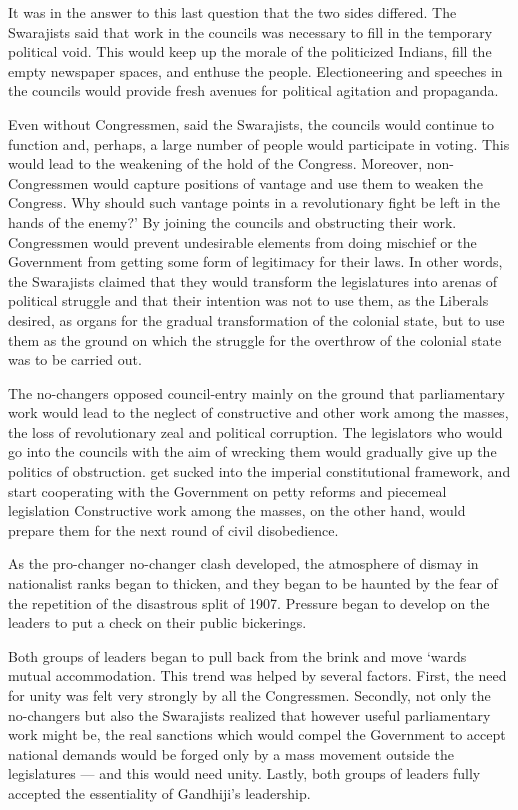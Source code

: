 It was in the answer to this last question that the two sides differed. The Swarajists said that work in the councils was necessary to fill in the temporary political void. This would keep up the morale of the politicized Indians, fill the empty newspaper spaces, and enthuse the people. Electioneering and speeches in the councils would provide fresh avenues for political agitation and propaganda.

Even without Congressmen, said the Swarajists, the councils would continue to function and, perhaps, a large number of people would participate in voting. This would lead to the weakening of the hold of the Congress. Moreover, non- Congressmen would capture positions of vantage and use them to weaken the Congress. Why should such vantage points in a revolutionary fight be left in the hands of the enemy?' By joining the councils and obstructing their work. Congressmen would prevent undesirable elements from doing mischief or the Government from getting some form of legitimacy for their laws. In other words, the Swarajists claimed that they would transform the legislatures into arenas of political struggle and that their intention was not to use them, as the Liberals desired, as organs for the gradual transformation of the colonial state, but to use them as the ground on which the struggle for the overthrow of the colonial state was to be carried out.

The no-changers opposed council-entry mainly on the ground that parliamentary work would lead to the neglect of constructive and other work among the masses, the loss of revolutionary zeal and political corruption. The legislators who would go into the councils with the aim of wrecking them would gradually give up the politics of obstruction. get sucked into the imperial constitutional framework, and start cooperating with the Government on petty reforms and piecemeal legislation Constructive work among the masses, on the other hand, would prepare them for the next round of civil disobedience.

As the pro-changer no-changer clash developed, the atmosphere of dismay in nationalist ranks began to thicken, and they began to be haunted by the fear of the repetition of the disastrous split of 1907. Pressure began to develop on the leaders to put a check on their public bickerings.

Both groups of leaders began to pull back from the brink and move `wards mutual accommodation. This trend was helped by several factors. First, the need for unity was felt very strongly by all the Congressmen. Secondly, not only the no-changers but also the Swarajists realized that however useful parliamentary work might be, the real sanctions which would compel the Government to accept national demands would be forged only by a mass movement outside the legislatures --- and this would need unity. Lastly, both groups of leaders fully accepted the essentiality of Gandhiji's leadership.

